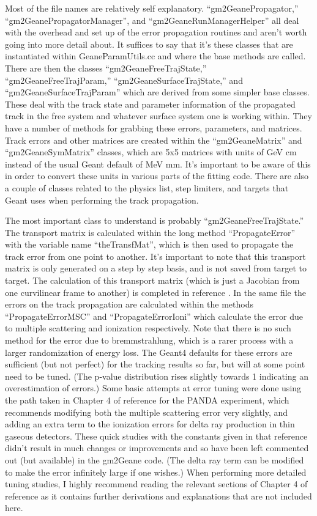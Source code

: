 	Most of the file names are relatively self explanatory. ``gm2GeanePropagator,'' ``gm2GeanePropagatorManager'', and ``gm2GeaneRunManagerHelper'' all deal with the overhead and set up of the error propagation routines and aren't worth going into more detail about. It suffices to say that it's these classes that are instantiated within GeaneParamUtils.cc and where the base methods are called. There are then the classes ``gm2GeaneFreeTrajState,'' ``gm2GeaneFreeTrajParam,'' ``gm2GeaneSurfaceTrajState,'' and ``gm2GeaneSurfaceTrajParam'' which are derived from some simpler base classes. These deal with the track state and parameter information of the propagated track in the free system and whatever surface system one is working within. They have a number of methods for grabbing these errors, parameters, and matrices. Track errors and other matrices are created within the ``gm2GeaneMatrix'' and ``gm2GeaneSymMatrix'' classes, which are 5x5 matrices with units of GeV cm instead of the usual Geant default of MeV mm. It's important to be aware of this in order to convert these units in various parts of the fitting code. There are also a couple of classes related to the physics list, step limiters, and targets that Geant uses when performing the track propagation. 

	The most important class to understand is probably ``gm2GeaneFreeTrajState.'' The transport matrix is calculated within the long method ``PropagateError'' with the variable name ``theTransfMat'', which is then used to propagate the track error from one point to another. It's important to note that this transport matrix is only generated on a step by step basis, and is not saved from target to target. The calculation of this transport matrix (which is just a Jacobian from one curvilinear frame to another) is completed in reference \cite{jacob}. In the same file the errors on the track propagation are calculated within the methods ``PropagateErrorMSC'' and ``PropagateErrorIoni'' which calculate the error due to multiple scattering and ionization respectively. Note that there is no such method for the error due to bremmstrahlung, which is a rarer process with a larger randomization of energy loss. The Geant4 defaults for these errors are sufficient (but not perfect) for the tracking results so far, but will at some point need to be tuned. (The p-value distribution rises slightly towards 1 indicating an overestimation of errors.) Some basic attempts at error tuning were done using the path taken in Chapter 4 of reference \cite{Lavezzi} for the PANDA experiment, which recommends modifying both the multiple scattering error very slightly, and adding an extra term to the ionization errors for delta ray production in thin gaseous detectors. These quick studies with the constants given in that reference didn't result in much changes or improvements and so have been left commented out (but available) in the gm2Geane code. (The delta ray term can be modified to make the error infinitely large if one wishes.) When performing more detailed tuning studies, I highly recommend reading the relevant sections of Chapter 4 of reference \cite{Lavezzi} as it contains further derivations and explanations that are not included here.

